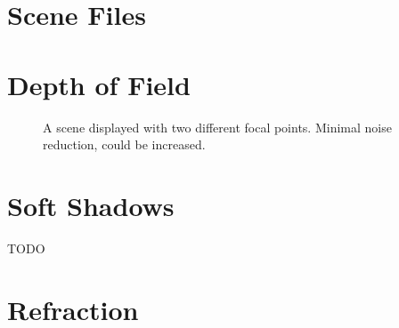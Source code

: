 \documentclass{article}
\begin{document}
\section{Scene Files}

\section{Depth of Field}

\begin{figure}[H]
    \centering
    \caption{A scene displayed with two different focal points. Minimal noise reduction, could be increased.}
\end{figure}

\section{Soft Shadows}

TODO

\section{Refraction}
\end{document}
